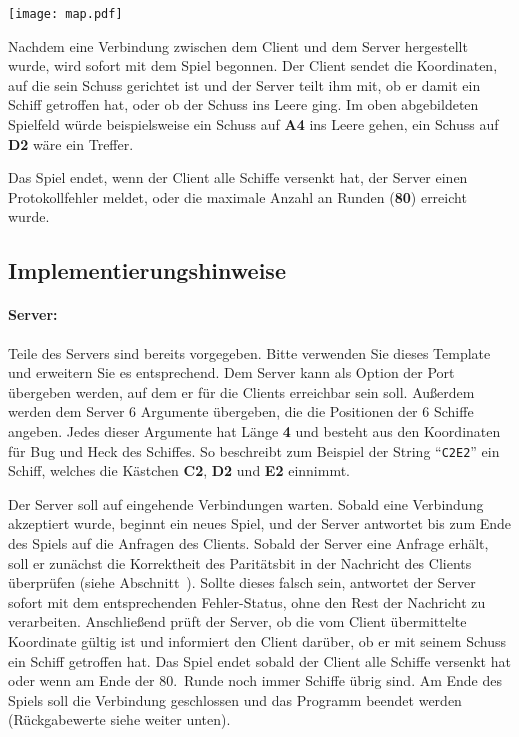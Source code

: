 {\centering
\texttt{[image: map.pdf]} \par
}

Nachdem eine Verbindung zwischen dem Client und dem Server hergestellt wurde,
wird sofort mit dem Spiel begonnen.
Der Client sendet die Koordinaten, auf die sein Schuss gerichtet ist
und der Server teilt ihm mit, ob er damit ein Schiff getroffen hat,
oder ob der Schuss ins Leere ging.
Im oben abgebildeten Spielfeld würde beispielsweise ein Schuss auf \textbf{A4} ins Leere gehen,
ein Schuss auf \textbf{D2} wäre ein Treffer.

Das Spiel endet, wenn der Client alle Schiffe versenkt hat, der Server einen
Protokollfehler meldet, oder die maximale Anzahl an Runden (\textbf{80})
erreicht wurde.

\subsection*{Implementierungshinweise}
\label{sec:implhints}
\paragraph{Server:}
Teile des Servers sind bereits vorgegeben. Bitte verwenden Sie dieses Template
und erweitern Sie es entsprechend.  Dem Server kann als Option der Port
übergeben werden, auf dem er für die Clients erreichbar sein soll.
Außerdem werden dem Server 6 Argumente übergeben, die die Positionen der 6 Schiffe angeben.
Jedes dieser Argumente hat Länge \textbf{4} und besteht aus den Koordinaten für Bug und Heck des Schiffes.
So beschreibt zum Beispiel der String ``\verb|C2E2|''
ein Schiff, welches die Kästchen \textbf{C2}, \textbf{D2} und \textbf{E2} einnimmt.

Der Server soll auf eingehende Verbindungen warten. Sobald eine Verbindung
akzeptiert wurde, beginnt ein neues Spiel, und der Server antwortet bis zum
Ende des Spiels auf die Anfragen des Clients.
Sobald der Server eine Anfrage erhält, soll er zunächst die Korrektheit des Paritätsbit in der Nachricht des Clients
überprüfen (siehe Abschnitt~).
Sollte dieses falsch sein, antwortet der Server sofort mit dem entsprechenden Fehler-Status,
ohne den Rest der Nachricht zu verarbeiten.
Anschließend prüft der Server, ob die vom Client übermittelte Koordinate gültig ist
und informiert den Client darüber, ob er mit seinem Schuss ein Schiff getroffen hat.
Das Spiel endet sobald der Client alle Schiffe versenkt hat
oder wenn am Ende der 80.\ Runde noch immer Schiffe übrig sind.
Am Ende des Spiels soll die Verbindung geschlossen und das Programm beendet werden
(Rückgabewerte siehe weiter unten).

